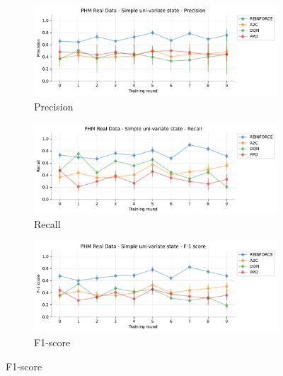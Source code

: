 \documentclass[a4paper, 12pt]{article}
\begin{document}
\begin{figure}[ht]
	\begin{subfigure}{\textwidth}
		\centering
		\includegraphics[width=\linewidth]{Singevariable_Pr.pdf}  
		\caption{Precision}
		\label{fig:tr-ss-pr}
	\end{subfigure} \par\smallskip
	
	\begin{subfigure}{\textwidth}
		\centering
		\includegraphics[width=\linewidth]{Singevariable_Rc.pdf}  
		\caption{Recall}
		\label{fig:tr-ss-rc}
	\end{subfigure} \par\smallskip
	
	\begin{subfigure}{\textwidth}
		\centering
		\includegraphics[width=\linewidth]{Singevariable_F1.pdf}  
		\caption{F1-score}
		\label{fig:tr-ss-f1}
	\end{subfigure} \par\smallskip
	

\end{figure}
\end{document}
